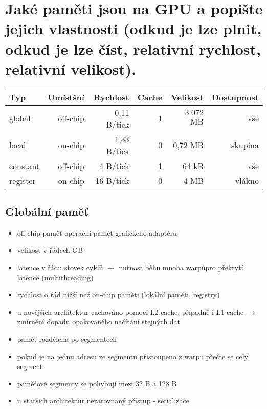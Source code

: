 \section{Jaké paměti jsou na GPU a popište jejich vlastnosti (odkud je lze plnit, odkud je lze číst, relativní rychlost, relativní velikost).}
	\begin{center}
		\begin{tabular}{l|rrrrr}
			\textbf{Typ} & \textbf{Umístšní} & \textbf{Rychlost} & \textbf{Cache} & \textbf{Velikost} & \textbf{Dostupnost} \\ \hline
			global       & off-chip          & 0,11 B/tick        & 1              & $3\;072$ MB           & vše \\
			local        & on-chip           & 1,33 B/tick       & 0              & 0,72 MB           & skupina \\
			constant     & off-chip          & 4 B/tick          & 1              & 64 kB             & vše \\
			register     & on-chip           & 16 B/tick         & 0              & 4 MB              & vlákno                                 
		\end{tabular}
	\end{center}

	\subsection*{Globální paměť}
	\begin{itemize}
		\setlength\itemsep{0em}
		\item off-chip paměť operační paměť grafického adaptéru
		\item velikost v řádech GB
		\item latence v řádu stovek cyklů $\rightarrow$ nutnost běhu mnoha warpůpro překrytí latence (multithreading)
		\item rychlost o řád nižší než on-chip paměti (lokální paměti, registry)
		\item u novějších architektur cachováno pomocí L2 cache, případně i L1 cache $\rightarrow$ zmírnění dopadu opakovaného načítání stejných dat
		\item paměť rozdělena po segmentech
		\item pokud je na jednu adresu ze segmentu přistoupeno z warpu přečte se celý segment
		\item paměťové segmenty se pohybují mezi 32 B a 128 B
		\item u starších architektur nezarovnaný přístup - serializace
	\end{itemize}

